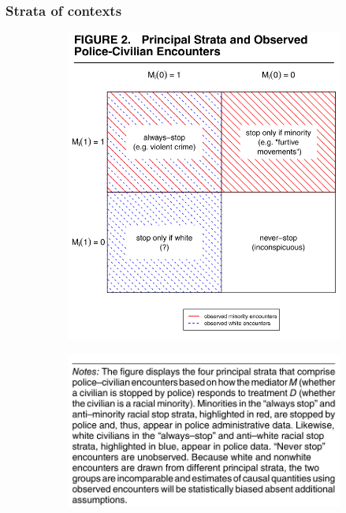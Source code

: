 \documentclass[12pt,english,dvipsnames,aspectratio=169,handout]{beamer}\usepackage[]{graphicx}\usepackage[]{xcolor}
\begin{document}
\begin{frame}
  \frametitle{Strata of contexts}
  
  \begin{figure}
  \begin{subfigure}{0.47\linewidth}
  \centering
  \includegraphics[scale = 0.35]{../04-figures/04/04-07}
  \end{subfigure}
  \begin{subfigure}{0.47\linewidth}
  \centering
  \includegraphics[scale = 0.35]{../04-figures/04/04-08}
  \end{subfigure}
  \end{figure}
  
  
\end{frame}
\end{document}
